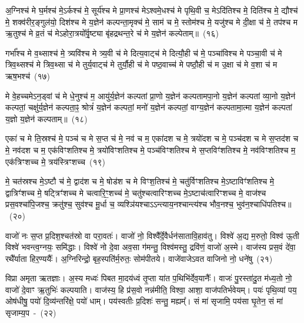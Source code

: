 {\anuvakamend[{गृ॒हाश्च॒ षोड॑श च}]}

अ॒ग्निश्च॑ मे घ॒र्मश्च॑ मे॒\-ऽर्कश्च॑ मे॒ सूर्य॑श्च मे प्रा॒णश्च॑ मे\-ऽश्वमे॒धश्च॑ मे पृथि॒वी च॒ मे\-ऽदि॑तिश्च मे॒ दिति॑श्च मे॒ द्यौश्च॑ मे॒ शक्व॑रीर॒ङ्गुल॑यो॒ दिश॑श्च मे य॒ज्ञेन॑ कल्पन्ता॒मृक्च॑ मे॒ साम॑ च मे॒ स्तोम॑श्च मे॒ यजु॑श्च मे दी॒क्षा च॑ मे॒ तप॑श्च म ऋ॒तुश्च॑ मे व्र॒तं च॑ मे\-ऽहोरा॒त्रयो᳚र्वृ॒ष्ट्या बृ॑हद्रथन्त॒रे च॑ मे य॒ज्ञेन॑ कल्पेताम्॥~(१६)\ip

{\anuvakamend[{दी॒क्षा\-ऽष्टाद॑श च}]}

गर्भा᳚श्च मे व॒थ्साश्च॑ मे॒ त्र्यवि॑श्च मे त्र्य॒वी च॑ मे दित्य॒वाट्च॑ मे दित्यौ॒ही च॑ मे॒ पञ्चा॑विश्च मे पञ्चा॒वी च॑ मे त्रिव॒थ्सश्च॑ मे त्रिव॒थ्सा च॑ मे तुर्य॒वाट्च॑ मे तुर्यौ॒ही च॑ मे पष्ठ॒वाच्च॑ मे पष्ठौ॒ही च॑ म उ॒क्षा च॑ मे व॒शा च॑ म ऋष॒भश्च॑~(१७)\ip

मे वे॒हच्चमे\-ऽन॒ड्वां च॑ मे धे॒नुश्च॑ म॒ आयु॑र्य॒ज्ञेन॑ कल्पतां प्रा॒णो य॒ज्ञेन॑ कल्पतामपा॒नो य॒ज्ञेन॑ कल्पतां व्या॒नो य॒ज्ञेन॑ कल्पतां॒ चक्षु॑र्य॒ज्ञेन॑ कल्पता॒ꣴ॒ श्रोत्रं॑ य॒ज्ञेन॑ कल्पतां॒ मनो॑ य॒ज्ञेन॑ कल्पतां॒ वाग्य॒ज्ञेन॑ कल्पतामा॒त्मा य॒ज्ञेन॑ कल्पतां य॒ज्ञो य॒ज्ञेन॑ कल्पताम्॥~(१८)\ip

{\anuvakamend[{ऋ॒ष॒भश्च॑ चत्वारि॒ꣳ॒शच्च॑}]}%

एका॑ च मे ति॒स्रश्च॑ मे॒ पञ्च॑ च मे स॒प्त च॑ मे॒ नव॑ च म॒ एका॑\-दश च मे॒ त्रयो॑दश च मे॒ पञ्च॑दश च मे स॒प्तद॑श च मे॒ नव॑दश च म॒ एक॑विꣳशतिश्च मे॒ त्रयो॑विꣳशतिश्च मे॒ पञ्च॑विꣳशतिश्च मे स॒प्तविꣳ॑शतिश्च मे॒ नव॑विꣳशतिश्च म॒ एक॑त्रिꣳशच्च मे॒ त्रय॑स्त्रिꣳशच्च~(१९)\ip

मे॒ चत॑स्रश्च मे॒\-ऽष्टौ च॑ मे॒ द्वाद॑श च मे॒ षोड॑श च मे विꣳश॒तिश्च॑ मे॒ चतु॑र्विꣳशतिश्च मे॒\-ऽष्टाविꣳ॑शतिश्च मे॒ द्वात्रिꣳ॑शच्च मे॒ षट्त्रिꣳ॑शच्च मे चत्वारि॒ꣳ॒शच्च॑ मे॒ चतु॑श्चत्वारिꣳशच्च मे॒\-ऽष्टाच॑त्वारिꣳशच्च मे॒ वाज॑श्च प्रस॒वश्चा॑पि॒जश्च॒ क्रतु॑श्च॒ सुव॑श्च मू॒र्धा च॒ व्यश्ञि॑यश्चा\-ऽऽ\-न्त्याय॒नश्चान्त्य॑श्च भौव॒नश्च॒ भुव॑न॒श्चाधि॑\-पतिश्च॥~(२०)\ip

{\anuvakamend[{त्रय॑स्त्रिꣳशच्च॒ व्यश्ञि॑य॒ एका॑\-दश च}]}%

वाजो॑ नः स॒प्त प्र॒दिश॒श्चत॑स्रो वा परा॒वतः॑। वाजो॑ नो॒ विश्वै᳚र्दे॒वैर्धन॑सातावि॒हाव॑तु। विश्वे॑ अ॒द्य म॒रुतो॒ विश्व॑ ऊ॒ती विश्वे॑ भवन्त्व॒ग्नयः॒ समि॑द्धाः। विश्वे॑ नो दे॒वा अव॒सा ग॑मन्तु॒ विश्व॑मस्तु॒ द्रवि॑णं॒ वाजो॑ अ॒स्मे। वाज॑स्य प्रस॒वं दे॑वा॒ रथै᳚र्याता हिर॒ण्ययैः᳚। अ॒ग्निरिन्द्रो॒ बृह॒स्पति॑र्म॒रुतः॒ सोम॑पीतये। वाजे॑वाजे\-ऽवत वाजिनो नो॒ धने॑षु~(२१)\ip

विप्रा अमृता ऋतज्ञाः। अ॒स्य मध्वः॑ पिबत मा॒दय॑ध्वं तृ॒प्ता या॑त प॒थिभि॑र्देव॒यानैः᳚। वाजः॑ पु॒रस्ता॑दु॒त म॑ध्य॒तो नो॒ वाजो॑ दे॒वाꣳ ऋ॒तुभिः॑ कल्पयाति। वाज॑स्य॒ हि प्र॑स॒वो नन्न॑मीति॒ विश्वा॒ आशा॒ वाज॑पतिर्भवेयम्। पयः॑ पृथि॒व्यां पय॒ ओष॑धीषु॒ पयो॑ दि॒व्य॑न्तरि॑क्षे॒ पयो॑ धाम्। पय॑स्वतीः प्र॒दिशः॑ सन्तु॒ मह्यम्᳚। सं मा॑ सृजामि॒ पय॑सा घृ॒तेन॒ सं मा॑ सृजाम्य॒प~-~(२२)\ip

